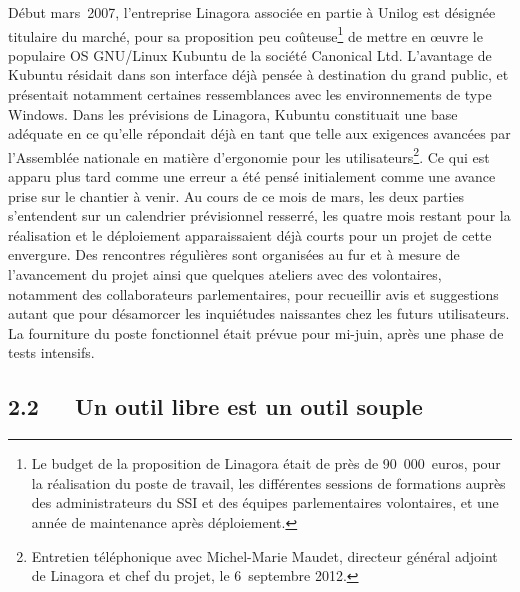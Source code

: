 \documentclass{FramateX}
\begin{document}
\begin{refsection}
Début mars~2007, l'entreprise Linagora associée en partie à Unilog est
désignée titulaire du marché, pour sa proposition peu
coûteuse\footnote{Le budget de la proposition de Linagora était de près
de 90~000~euros, pour la réalisation du poste de travail, les
différentes sessions de formations auprès des administrateurs du SSI et
des équipes parlementaires volontaires, et une année de maintenance
après déploiement.} de mettre en œuvre le populaire OS GNU/Linux
Kubuntu de la société Canonical Ltd. L'avantage de Kubuntu résidait
dans son interface déjà pensée à destination du grand public, et
présentait notamment certaines ressemblances avec les environnements de
type Windows. Dans les prévisions de Linagora, Kubuntu constituait une
base adéquate en ce qu'elle répondait déjà en tant que telle aux
exigences avancées par l'Assemblée nationale en matière d'ergonomie
pour les utilisateurs\footnote{Entretien téléphonique avec Michel-Marie
Maudet, directeur général adjoint de Linagora et chef du projet, le
6~septembre 2012.}. Ce qui est apparu plus tard comme une erreur a été
pensé initialement comme une avance prise sur le chantier à venir. Au
cours de ce mois de mars, les deux parties s'entendent sur un
calendrier prévisionnel resserré, les quatre mois restant pour la
réalisation et le déploiement apparaissaient déjà courts pour un projet
de cette envergure. Des rencontres régulières sont organisées au fur et
à mesure de l'avancement du projet ainsi que quelques ateliers avec des
volontaires, notamment des collaborateurs parlementaires, pour
recueillir avis et suggestions autant que pour désamorcer les
inquiétudes naissantes chez les futurs utilisateurs. La fourniture du
poste fonctionnel était prévue pour mi-juin, après une phase de tests
intensifs.

\subsection*{2.2~~~Un outil libre est un outil souple}
{}


\end{refsection}
\end{document}
